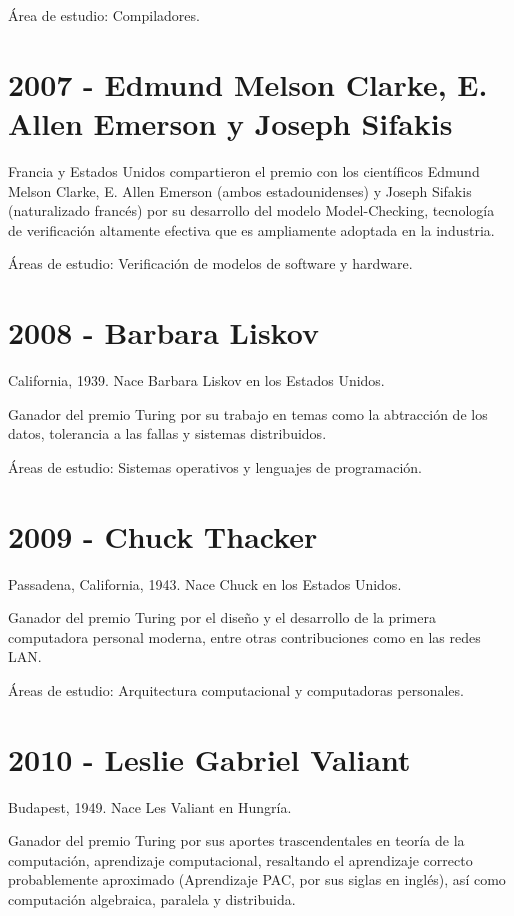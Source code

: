 \documentclass[notitlepage,letterpaper, 11pt]{article}
\begin{document}
\noindent Área de estudio: Compiladores.
\newline

\section*{2007 - Edmund Melson Clarke, E. Allen Emerson y Joseph Sifakis}
\noindent Francia y Estados Unidos compartieron el premio con los científicos Edmund Melson Clarke, E. Allen Emerson (ambos estadounidenses) y Joseph Sifakis (naturalizado francés) por su desarrollo del modelo Model-Checking, tecnología de verificación altamente efectiva que es ampliamente adoptada en la industria.

\noindent Áreas de estudio: Verificación de modelos de software y hardware.
\newline

\section*{2008 - Barbara Liskov}
\noindent California, 1939. Nace Barbara Liskov en los Estados Unidos.

\noindent Ganador del premio Turing por su trabajo en temas como la abtracción de los datos, tolerancia a las fallas y sistemas distribuidos.

\noindent Áreas de estudio: Sistemas operativos y lenguajes de programación.
\newline

\section*{2009 - Chuck Thacker}
\noindent Passadena, California, 1943. Nace Chuck en los Estados Unidos.

\noindent Ganador del premio Turing por el diseño y el desarrollo de la primera computadora personal moderna, entre otras contribuciones como en las redes LAN.

\noindent Áreas de estudio: Arquitectura computacional y computadoras personales.
\newline

\section*{2010 - Leslie Gabriel Valiant}
\noindent Budapest, 1949. Nace Les Valiant en Hungría.

\noindent Ganador del premio Turing por sus aportes trascendentales en teoría de la computación, aprendizaje computacional, resaltando el aprendizaje correcto probablemente aproximado (Aprendizaje PAC, por sus siglas en inglés), así como computación algebraica, paralela y distribuida.
\end{document}
